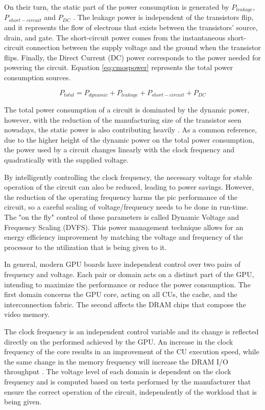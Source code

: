 On their turn, the static part of the power consumption is generated by $P_{leakage}$, $P_{short-circuit}$ and $P_{DC}$ \cite{mei_survey_2016}. The leakage power is independent of the transistors flip, and it represents the flow of electrons that exists between the transistors' source, drain, and gate. The short-circuit power comes from the instantaneous short-circuit connection between the supply voltage and the ground when the transistor flips. Finally, the Direct Current (DC) power corresponds to the power needed for powering the circuit. Equation \ref{eq:cmospower} represents the total power consumption sources.

\begin{equation}
    P_{total} = P_{dynamic} + P_{leakage} + P_{short-circuit} + P_{DC}
    \label{eq:cmospower}
\end{equation}

The total power consumption of a circuit is dominated by the dynamic power, however, with the reduction of the manufacturing size of the transistor seen nowadays, the static power is also contributing heavily \cite{s._hong_modeling_2012} \cite{hong_integrated_2010}. As a common reference, due to the higher height of the dynamic power on the total power consumption, the power used by a circuit changes linearly with the clock frequency and quadratically with the supplied voltage.


By intelligently controlling the clock frequency, the necessary voltage for stable operation of the circuit can also be reduced, leading to power savings. However, the reduction of the operating frequency harms the pic performance of the circuit, so a careful scaling of voltage/frequency needs to be done in run-time. The "on the fly" control of these parameters is called Dynamic Voltage and Frequency Scaling (DVFS). This power management technique allows for an energy efficiency improvement by matching the voltage and frequency of the processor to the utilization that is being given to it.

In general, modern GPU boards have independent control over two pairs of frequency and voltage. Each pair or domain acts on a distinct part of the GPU, intending to maximize the performance or reduce the power consumption. The first domain concerns the GPU core, acting on all CUs, the cache, and the interconnection fabric. The second affects the DRAM chips that compose the video memory. 

The clock frequency is an independent control variable and its change is reflected directly on the performed achieved by the GPU. An increase in the clock frequency of the core results in an improvement of the CU execution speed, while the same change in the memory frequency will increase the DRAM I/O throughput \cite{mei_survey_2016}. The voltage level of each domain is dependent on the clock frequency and is computed based on tests performed by the manufacturer that ensure the correct operation of the circuit, independently of the workload that is being given.

